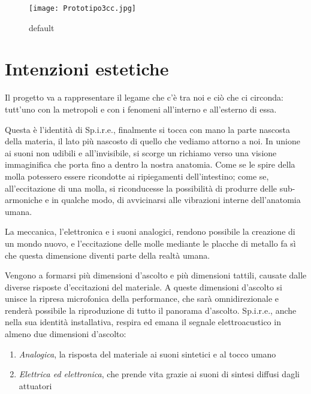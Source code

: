 \begin{figure}[htbp]
\begin{center}
\texttt{[image: Prototipo3cc.jpg]}
\caption{default}
\label{default}
\end{center}
\end{figure}


\section{Intenzioni estetiche}
Il progetto va a rappresentare il legame che c'è tra noi e ciò che ci circonda: tutt'uno con la metropoli e con i fenomeni all'interno e all'esterno di essa.

Questa è l'identità di Sp.i.r.e., finalmente si tocca con mano la parte nascosta della materia, il lato più nascosto di quello che vediamo attorno a noi. In unione ai suoni non udibili e all'invisibile, si scorge un richiamo verso una visione immaginifica che porta fino a dentro la nostra anatomia. Come se le spire della molla potessero essere ricondotte ai ripiegamenti dell'intestino; come se, all'eccitazione di una molla, si riconducesse la possibilità di produrre delle sub-armoniche e in qualche modo, di avvicinarsi alle vibrazioni interne dell'anatomia umana.

La meccanica, l'elettronica e i suoni analogici, rendono possibile la creazione di un mondo nuovo, e l'eccitazione delle molle mediante le placche di metallo fa sì che questa dimensione diventi parte della realtà umana.

Vengono a formarsi più dimensioni d'ascolto e più dimensioni tattili, causate dalle diverse risposte d'eccitazioni del materiale. A queste dimensioni d'ascolto si unisce la ripresa microfonica della performance, che sarà omnidirezionale e renderà possibile la riproduzione di tutto il panorama d'ascolto. Sp.i.r.e., anche nella sua identità installativa, respira ed emana il segnale elettroacustico in almeno due dimensioni d'ascolto:
\begin{enumerate}
\item{\textit{Analogica}, la risposta del materiale ai suoni sintetici e al tocco umano}
\item{\textit{Elettrica ed elettronica}, che prende vita grazie ai suoni di sintesi diffusi dagli attuatori}
\end{enumerate}

